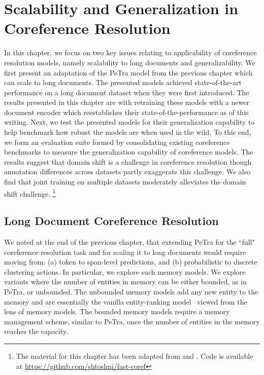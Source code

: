 \documentclass[12pt]{thesis-umich}[thesis]
\begin{document}
 
\chapter{Scalability and Generalization in Coreference Resolution}

In this chapter, we focus on two key issues relating to applicability of coreference resolution models, namely scalability to long documents and generalizability.
We first present an adaptation of the PeTra model from the previous chapter which can scale to long documents. 
The presented models achieved state-of-the-art performance on a long document dataset
when they were first introduced. 
The results presented in this chapter are with retraining these models with a newer document encoder which reestablishes their state-of-the-performance as of this writing.  
Next, we test the presented models for their generalization capability to help benchmark how robust the models are when used in the wild. 
To this end, we form an evaluation suite formed by consolidating existing coreference benchmarks to measure the generalization capability of coreference models.
The results suggest that domain shift is a challenge in coreference resolution though annotation differences across datasets partly exaggerate this challenge. 
We also find that joint training on multiple datasets moderately alleviates the domain shift challenge.
\footnote{The material for this chapter has been adapted from \citet{toshniwal-etal-2020-learning} and \citet{toshniwal-etal-2021-generalization}. Code is available at \url{https://github.com/shtoshni/fast-coref}}  




\section{Long Document Coreference Resolution}
We noted at the end of the previous chapter, that extending PeTra for the ``full" coreference resolution task and for scaling it to long documents would require moving from: (a) token to span-level predictions, and (b) probabilistic to discrete clustering actions. 
In particular, we explore such memory models.  
We explore variants where the number of entities in memory can be either bounded, as in PeTra, or unbounded. 
The unbounded memory models add any new entity to the memory and are essentially the vanilla entity-ranking model~\cite{rahman2011narrowing, stoyanov-eisner-2012-easy, websterC14} viewed from the lens of memory models.
The bounded memory models require a memory management scheme, similar to PeTra, once the number of entities in the memory reaches the capacity.
\end{document}
